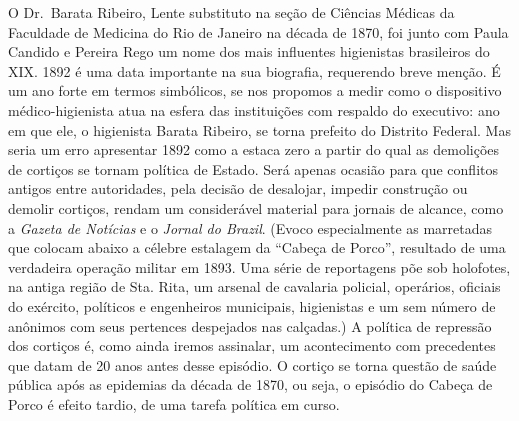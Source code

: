 O Dr.~Barata Ribeiro, Lente substituto na seção de Ciências Médicas da
Faculdade de Medicina do Rio de Janeiro na década de 1870, foi junto com
Paula Candido e Pereira Rego um nome dos mais influentes higienistas
brasileiros do XIX. 1892 é uma data importante na sua biografia,
requerendo breve menção. É um ano forte em termos simbólicos, se nos
propomos a medir como o dispositivo médico-higienista atua na esfera das
instituições com respaldo do executivo: ano em que ele, o higienista
Barata Ribeiro, se torna prefeito do Distrito Federal. Mas seria um erro
apresentar 1892 como a estaca zero a partir do qual as demolições de
cortiços se tornam política de Estado. Será apenas ocasião para que
conflitos antigos entre autoridades, pela decisão de desalojar, impedir
construção ou demolir cortiços, rendam um considerável material para
jornais de alcance, como a \textit{Gazeta de Notícias} e o \textit{Jornal do
Brazil}. (Evoco especialmente as marretadas que colocam abaixo a célebre
estalagem da ``Cabeça de Porco'', resultado de uma verdadeira operação
militar em 1893. Uma série de reportagens põe sob holofotes, na antiga
região de Sta. Rita, um arsenal de cavalaria policial, operários,
oficiais do exército, políticos e engenheiros municipais, higienistas e
um sem número de anônimos com seus pertences despejados nas calçadas.) A
política de repressão dos cortiços é, como ainda iremos assinalar, um
acontecimento com precedentes que datam de 20 anos antes desse episódio.
O cortiço se torna questão de saúde pública após as epidemias da década
de 1870, ou seja, o episódio do Cabeça de Porco é efeito tardio, de uma
tarefa política em curso.

